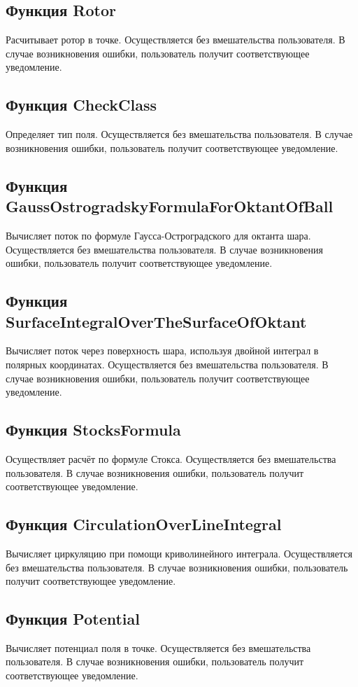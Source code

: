 \documentclass[14pt,a4paper,final]{extreport}
\begin{document}
\subsection{Функция Rotor}
Расчитывает ротор в точке. Осуществляется без вмешательства пользователя. 
В случае возникновения ошибки, пользователь получит соответствующее уведомление.

\subsection{Функция CheckClass}
Определяет тип поля. Осуществляется без вмешательства пользователя. 
В случае возникновения ошибки, пользователь получит соответствующее уведомление.

\subsection{Функция GaussOstrogradskyFormulaForOktantOfBall}
Вычисляет поток по формуле Гаусса-Остроградского для октанта шара. Осуществляется без вмешательства пользователя. 
В случае возникновения ошибки, пользователь получит соответствующее уведомление.

\subsection{Функция SurfaceIntegralOverTheSurfaceOfOktant}
Вычисляет поток через поверхность шара, используя двойной интеграл в полярных координатах. Осуществляется без вмешательства пользователя. 
В случае возникновения ошибки, пользователь получит соответствующее уведомление.

\subsection{Функция StocksFormula}
Осуществляет расчёт по формуле Стокса. Осуществляется без вмешательства пользователя. 
В случае возникновения ошибки, пользователь получит соответствующее уведомление.

\subsection{Функция CirculationOverLineIntegral}
Вычисляет циркуляцию при помощи криволинейного интеграла. Осуществляется без вмешательства пользователя. 
В случае возникновения ошибки, пользователь получит соответствующее уведомление.

\subsection{Функция Potential}
Вычисляет потенциал поля в точке. Осуществляется без вмешательства пользователя. 
В случае возникновения ошибки, пользователь получит соответствующее уведомление.
\end{document}
